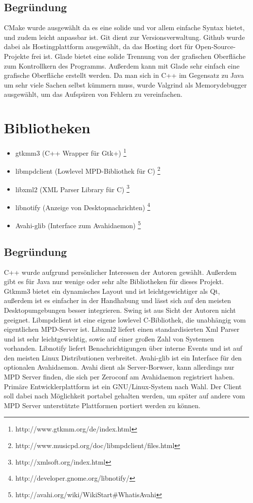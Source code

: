 \subsection{Begründung}
CMake wurde ausgewählt da es eine solide und vor allem einfache Syntax bietet, und zudem leicht anpassbar ist. 
Git dient zur Versionsverwaltung. Github wurde dabei als Hostingplattform ausgewählt, da das Hosting dort für Open-Source-Projekte
frei ist. Glade bietet eine solide Trennung von der grafischen  Oberfläche zum Kontrollkern des Programms. Außerdem kann mit Glade sehr
einfach eine grafische Oberfläche erstellt werden. Da man sich in C++ im Gegensatz zu Java um sehr viele Sachen selbst kümmern muss,
wurde Valgrind als Memorydebugger ausgewählt, um das Aufspüren von Fehlern zu vereinfachen.
\section{Bibliotheken}
\begin{itemize}
\item gtkmm3 (C++ Wrapper für Gtk+) \footnote{http://www.gtkmm.org/de/index.html}
\item libmpdclient (Lowlevel MPD-Bibliothek für C) \footnote{http://www.musicpd.org/doc/libmpdclient/files.html}
\item libxml2 (XML Parser Library für C) \footnote{http://xmlsoft.org/index.html}
\item libnotify (Anzeige von Desktopnachrichten) \footnote{http://developer.gnome.org/libnotify/}
\item Avahi-glib (Interface zum Avahidaemon) \footnote{http://avahi.org/wiki/WikiStart\#WhatisAvahi}
\end{itemize}
\subsection{Begründung}
C++ wurde aufgrund persönlicher Interessen der Autoren gewählt. Außerdem gibt es für Java nur wenige
oder sehr alte Bibliotheken für dieses Projekt. Gtkmm3 bietet ein dynamisches Layout und ist
leichtgewichtiger als Qt, außerdem ist es einfacher in der Handhabung und lässt sich auf den meisten 
Desktopumgebungen besser integrieren. Swing ist aus Sicht der Autoren nicht geeignet.
Libmpdclient ist eine eigene lowlevel C-Bibliothek, die unabhängig vom eigentlichen MPD-Server ist.
Libxml2 liefert einen standardisierten Xml Parser und ist sehr leichtgewichtig, sowie auf einer großen Zahl von Systemen vorhanden.
Libnotify liefert Benachrichtigungen über interne Events und ist auf den meisten Linux
Distributionen verbreitet. Avahi-glib ist ein Interface für den optionalen Avahidaemon. Avahi 
dient als Server-Borwser, kann allerdings nur MPD Server finden, die sich per Zeroconf am Avahidaemon registriert
haben.
\\ 
Primäre Entwicklerplattform ist ein GNU/Linux-System nach Wahl. Der Client soll dabei nach Möglichkeit portabel gehalten werden, um später 
auf andere vom MPD Server unterstützte Plattformen portiert werden zu können.
